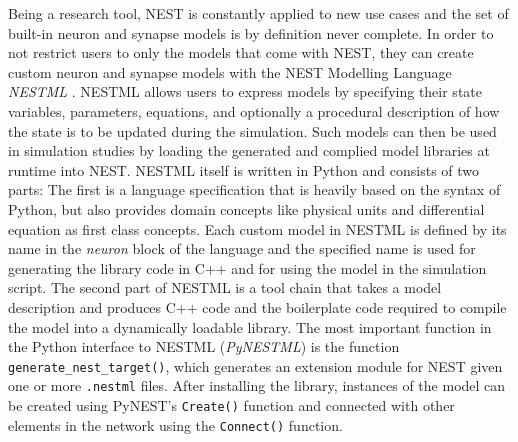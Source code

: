 Being a research tool, NEST is constantly applied to new use cases and the set of built-in neuron and synapse models is by definition never complete. In order to not restrict users to only the models that come with NEST, they can create custom neuron and synapse models with the NEST Modelling Language \emph{NESTML} \citep{plotnikov2016nestml, linssen_charl_a_p_2022_5784175}. NESTML allows users to express models by specifying their state variables, parameters, equations, and optionally a procedural description of how the state is to be updated during the simulation. Such models can then be used in simulation studies by loading the generated and complied model libraries at runtime into NEST. NESTML itself is written in Python and consists of two parts: The first is a language specification that is heavily based on the syntax of Python, but also provides domain concepts like physical units and differential equation as first class concepts. Each custom model in NESTML is defined by its name in the \emph{neuron} block of the language and the specified name is used for generating the library code in C++ and for using the model in the simulation script. The second part of NESTML is a tool chain that takes a model description and produces C++ code and the boilerplate code required to compile the model into a dynamically loadable library. The most important function in the Python interface to NESTML (\emph{PyNESTML}) is the function \texttt{generate\_nest\_target()}, which generates an extension module for NEST given one or more \texttt{.nestml} files. After installing the library, instances of the model can be created using PyNEST's \texttt{Create()} function and connected with other elements in the network using the \texttt{Connect()} function.

